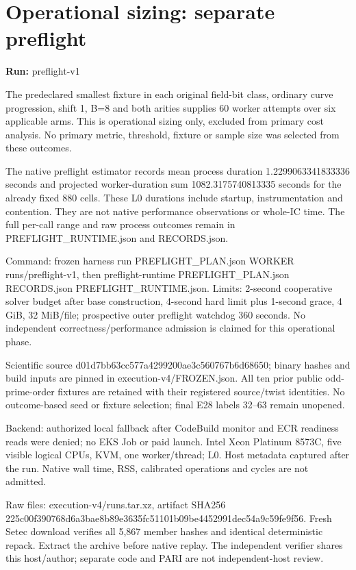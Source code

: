 \documentclass[10pt]{article}
\begin{document}
\section*{Operational sizing: separate preflight}
\textbf{Run:} preflight-v1\par
The predeclared smallest fixture in each original field-bit class, ordinary curve progression, shift 1, B=8 and both arities supplies 60 worker attempts over six applicable arms. This is operational sizing only, excluded from primary cost analysis. No primary metric, threshold, fixture or sample size was selected from these outcomes.

The native preflight estimator records mean process duration 1.2299063341833336 seconds and projected worker-duration sum 1082.3175740813335 seconds for the already fixed 880 cells. These L0 durations include startup, instrumentation and contention. They are not native performance observations or whole-IC time. The full per-call range and raw process outcomes remain in PREFLIGHT\_RUNTIME.json and RECORDS.json.

Command: frozen harness run PREFLIGHT\_PLAN.json WORKER runs/preflight-v1, then preflight-runtime PREFLIGHT\_PLAN.json RECORDS.json PREFLIGHT\_RUNTIME.json. Limits: 2-second cooperative solver budget after base construction, 4-second hard limit plus 1-second grace, 4 GiB, 32 MiB/file; prospective outer preflight watchdog 360 seconds. No independent correctness/performance admission is claimed for this operational phase.

Scientific source d01d7bb6\allowbreak{}3cc577a4\allowbreak{}299200ae\allowbreak{}3c560767\allowbreak{}b6d68650; binary hashes and build inputs are pinned in execution-v4/FROZEN.json. All ten prior public odd-prime-order fixtures are retained with their registered source/twist identities. No outcome-based seed or fixture selection; final E28 labels 32–63 remain unopened.

Backend: authorized local fallback after CodeBuild monitor and ECR readiness reads were denied; no EKS Job or paid launch. Intel Xeon Platinum 8573C, five visible logical CPUs, KVM, one worker/thread; L0. Host metadata captured after the run. Native wall time, RSS, calibrated operations and cycles are not admitted.

Raw files: execution-v4/runs.tar.xz, artifact SHA256 225c00f3\allowbreak{}90768d6a\allowbreak{}3bae8b89\allowbreak{}e3635fc5\allowbreak{}1101b09b\allowbreak{}e4452991\allowbreak{}dec54a9c\allowbreak{}59fe9f56. Fresh Setec download verifies all 5,867 member hashes and identical deterministic repack. Extract the archive before native replay. The independent verifier shares this host/author; separate code and PARI are not independent-host review.
\end{document}
